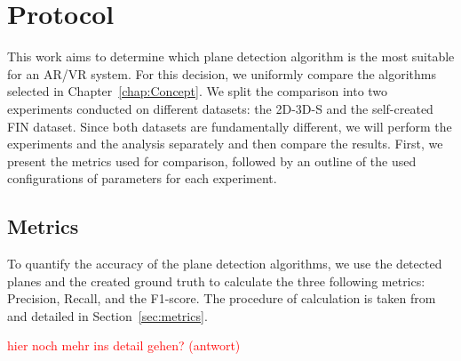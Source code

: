 \documentclass[main.tex]{subfiles}
\begin{document}
\section{Protocol}
This work aims to determine which plane detection algorithm is the most suitable for an AR/VR system. For this decision, we uniformly compare the algorithms selected in
Chapter~\ref{chap:Concept}. We split the comparison into two experiments conducted on different datasets: the 2D-3D-S and the
self-created FIN dataset. Since both datasets are fundamentally different, we will perform the experiments and the analysis separately and then compare the results.
First, we present the metrics used for comparison, followed by an outline of the used configurations of parameters for each experiment.

\subsection{Metrics}
\label{subsec:metrics}
To quantify the accuracy of the plane detection algorithms, we use the detected planes and the created ground truth to calculate the three following
metrics: Precision, Recall, and the F1-score. The procedure of calculation is taken from~\cite[Section~4]{Araújo_Oliveira_2020} and detailed
in Section~\ref{sec:metrics}.


\textcolor{red}{hier noch mehr ins detail gehen? (antwort) \underline{\hspace{2cm}}}
\end{document}
